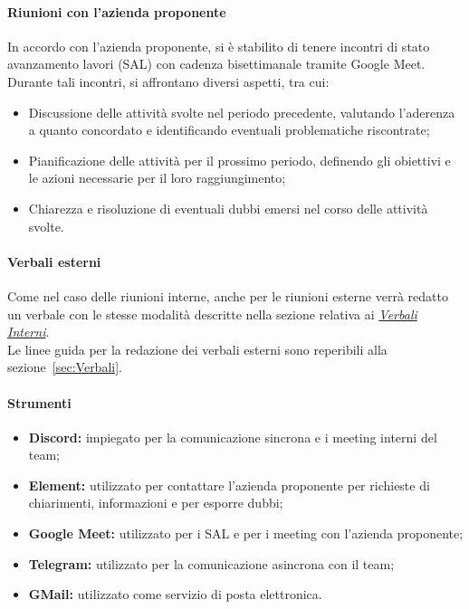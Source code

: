 \paragraph*{Riunioni con l'azienda proponente}
In accordo con l'azienda proponente, si è stabilito di tenere incontri di stato avanzamento lavori (SAL) con cadenza bisettimanale tramite Google Meet. \\
Durante tali incontri, si affrontano diversi aspetti, tra cui:
\begin{itemize}
    \item Discussione delle attività svolte nel periodo precedente, valutando l'aderenza a quanto concordato e identificando eventuali problematiche riscontrate;
    \item Pianificazione delle attività per il prossimo periodo, definendo gli obiettivi e le azioni necessarie per il loro raggiungimento;
    \item Chiarezza e risoluzione di eventuali dubbi emersi nel corso delle attività svolte.
\end{itemize}

\paragraph*{Verbali esterni}
Come nel caso delle riunioni interne, anche per le riunioni esterne verrà redatto un verbale con le stesse modalità descritte nella sezione relativa ai \hyperlink{par:verbaliInterni}{\textit{Verbali Interni}}. \\
Le linee guida per la redazione dei verbali esterni sono reperibili alla sezione~\ref{sec:Verbali}.

\paragraph{Strumenti}
\begin{itemize}
  \item \textbf{Discord:} impiegato per la comunicazione sincrona e i meeting interni del team;
  \item \textbf{Element:} utilizzato per contattare l'azienda proponente per richieste di chiarimenti, informazioni e per esporre dubbi;
  \item \textbf{Google Meet:} utilizzato per i SAL e per i meeting con l'azienda proponente;
  \item \textbf{Telegram:} utilizzato per la comunicazione asincrona con il team;
  \item \textbf{GMail:} utilizzato come servizio di posta elettronica.
\end{itemize}
\vspace{0.1cm}

